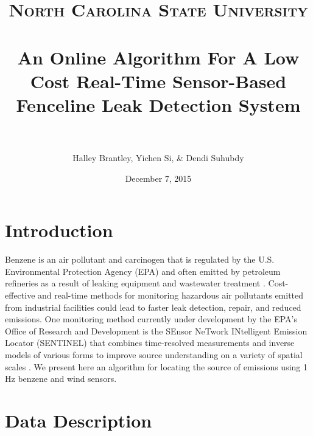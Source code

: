 \documentclass[fontsize=11pt]{scrartcl} %
\title{	
	\normalfont \normalsize 
	\textsc{North Carolina State University} \\ [5pt] %
	\horrule{0.5pt} \\[0.4cm] %
	\huge An Online Algorithm For A Low Cost Real-Time Sensor-Based Fenceline Leak Detection System\\ %
	\horrule{2pt} \\[0.5cm] %
}
\author{Halley Brantley, Yichen Si, \& Dendi Suhubdy} %
\date{\normalsize December 7, 2015} %
\begin{document}

\maketitle

\section{Introduction}
Benzene is an air pollutant and carcinogen that is regulated by the U.S. Environmental Protection Agency (EPA) and often emitted by petroleum refineries as a result of leaking equipment and wastewater treatment \cite{fencelinerule}. Cost-effective and real-time methods for monitoring hazardous air pollutants emitted from industrial facilities could lead to faster leak detection, repair, and reduced emissions. One monitoring method currently under development by the EPA's Office of Research and Development is the SEnsor NeTwork INtelligent Emission Locator (SENTINEL) that combines time-resolved measurements and inverse models of various forms to improve source understanding on a variety of spatial scales \cite{wan2015}. We present here an algorithm for locating the source of emissions using 1 Hz benzene and wind sensors.  
\vspace{10pt}

\section{Data Description}
\end{document}
